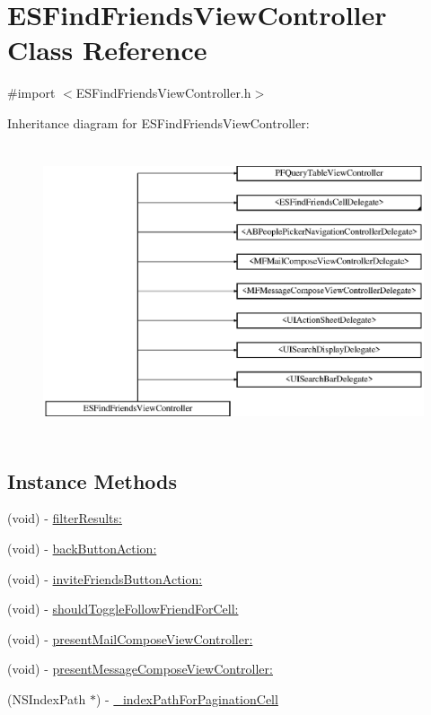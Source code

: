 \hypertarget{interface_e_s_find_friends_view_controller}{}\section{E\+S\+Find\+Friends\+View\+Controller Class Reference}
\label{interface_e_s_find_friends_view_controller}


{\ttfamily \#import $<$E\+S\+Find\+Friends\+View\+Controller.\+h$>$}

Inheritance diagram for E\+S\+Find\+Friends\+View\+Controller\+:\begin{figure}[H]
\begin{center}
\leavevmode
\includegraphics[height=8.630136cm]{interface_e_s_find_friends_view_controller}
\end{center}
\end{figure}
\subsection*{Instance Methods}
\begin{DoxyCompactItemize}
\item 
(void) -\/ \hyperlink{interface_e_s_find_friends_view_controller_aea2c5c41670192e263d62a994e07f57b}{filter\+Results\+:}
\item 
(void) -\/ \hyperlink{interface_e_s_find_friends_view_controller_ad37b70be7c5d133618350385269869ec}{back\+Button\+Action\+:}
\item 
(void) -\/ \hyperlink{interface_e_s_find_friends_view_controller_a5f5e255941faf25712a41079cb3e122c}{invite\+Friends\+Button\+Action\+:}
\item 
(void) -\/ \hyperlink{interface_e_s_find_friends_view_controller_a44909124c817f554c420d642cee636f7}{should\+Toggle\+Follow\+Friend\+For\+Cell\+:}
\item 
(void) -\/ \hyperlink{interface_e_s_find_friends_view_controller_ae5a9dfeb2878d93b6021860c9f333f27}{present\+Mail\+Compose\+View\+Controller\+:}
\item 
(void) -\/ \hyperlink{interface_e_s_find_friends_view_controller_ad1fc48a3454aa5f7cb2cb03eb105566c}{present\+Message\+Compose\+View\+Controller\+:}
\item 
(N\+S\+Index\+Path $\ast$) -\/ \hyperlink{interface_e_s_find_friends_view_controller_afc745b7afff5719eeb03ea1d04bab005}{\+\_\+index\+Path\+For\+Pagination\+Cell}
\end{DoxyCompactItemize}
